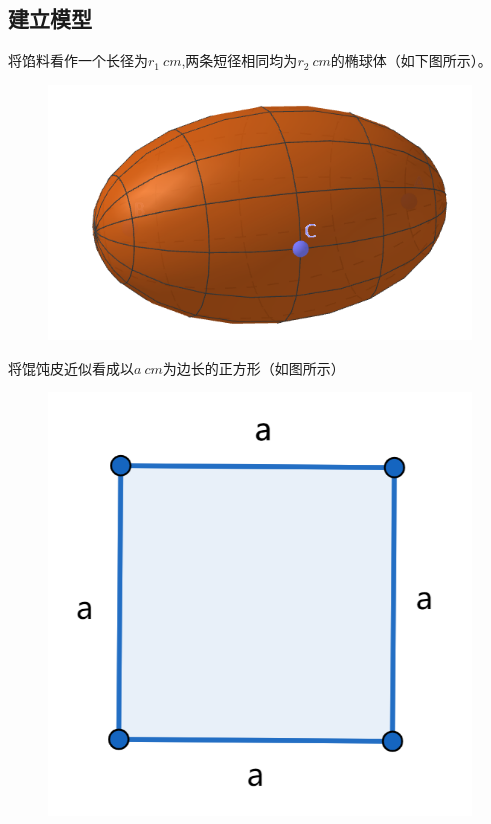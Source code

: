 \documentclass[lang=cn,a4paper]{elegantpaper}
\begin{document}
    \subsection{建立模型}
    将馅料看作一个长径为$r_1~cm$,两条短径相同均为$r_2~cm$的椭球体（如下图所示）。
    \begin{figure}[H]
        \centering
        \includegraphics[scale=0.2]{ellipsoids.png}
    \end{figure}
    将馄饨皮近似看成以$a~cm$为边长的正方形（如图所示）
    \begin{figure}[H]
        \centering
        \includegraphics[scale=0.5]{square.png}
    \end{figure}
\end{document}
